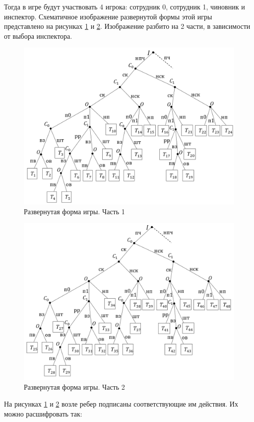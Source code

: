 Тогда в игре будут участвовать 4 игрока: сотрудник 0, сотрудник 1, чиновник и инспектор. Схематичное изображение развернутой формы этой игры представлено на рисунках \ref{fig:figef21} и \ref{fig:figef22}. Изображение разбито на 2 части, в зависимости от выбора инспектора.
\begin{figure}[H]
	\centering
	\includegraphics[width=0.9\linewidth]{inc/img/ef21}
	\caption{Развернутая форма игры. Часть 1}
	\label{fig:figef21}
\end{figure}
\begin{figure}[H]
	\centering
	\includegraphics[width=0.9\linewidth]{inc/img/ef22}
	\caption{Развернутая форма игры. Часть 2}
	\label{fig:figef22}
\end{figure}
\par
На рисунках \ref{fig:figef21} и \ref{fig:figef22} возле ребер подписаны соответствующие им действия. Их можно расшифровать так:
